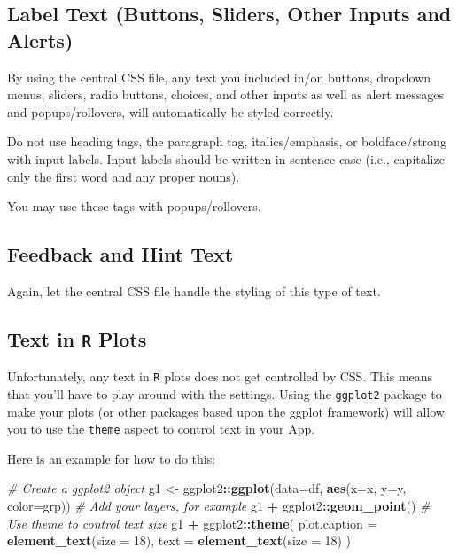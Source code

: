 \documentclass[
]{book}
\newenvironment{Shaded}{\begin{snugshade}}{\end{snugshade}}
\newcommand{\CommentTok}[1]{\textcolor[rgb]{0.56,0.35,0.01}{\textit{#1}}}
\newcommand{\DataTypeTok}[1]{\textcolor[rgb]{0.13,0.29,0.53}{#1}}
\newcommand{\DecValTok}[1]{\textcolor[rgb]{0.00,0.00,0.81}{#1}}
\newcommand{\KeywordTok}[1]{\textcolor[rgb]{0.13,0.29,0.53}{\textbf{#1}}}
\newcommand{\NormalTok}[1]{#1}
\newcommand{\OperatorTok}[1]{\textcolor[rgb]{0.81,0.36,0.00}{\textbf{#1}}}
\newcommand{\StringTok}[1]{\textcolor[rgb]{0.31,0.60,0.02}{#1}}
\begin{document}
\hypertarget{label-text-buttons-sliders-other-inputs-and-alerts}{%
\subsection{Label Text (Buttons, Sliders, Other Inputs and Alerts)}\label{label-text-buttons-sliders-other-inputs-and-alerts}}

By using the central CSS file, any text you included in/on buttons, dropdown menus, sliders, radio buttons, choices, and other inputs as well as alert messages and popups/rollovers, will automatically be styled correctly.

Do not use heading tags, the paragraph tag, italics/emphasis, or boldface/strong with input labels. Input labels should be written in sentence case (i.e., capitalize only the first word and any proper nouns).

You may use these tags with popups/rollovers.

\hypertarget{feedback-and-hint-text}{%
\subsection{Feedback and Hint Text}\label{feedback-and-hint-text}}

Again, let the central CSS file handle the styling of this type of text.

\hypertarget{text-in-r-plots}{%
\subsection{\texorpdfstring{Text in \texttt{R} Plots}{Text in R Plots}}\label{text-in-r-plots}}

Unfortunately, any text in \texttt{R} plots does not get controlled by CSS. This means that you'll have to play around with the settings. Using the \texttt{ggplot2} package to make your plots (or other packages based upon the ggplot framework) will allow you to use the \texttt{theme} aspect to control text in your App.

Here is an example for how to do this:

\begin{Shaded}
\begin{Highlighting}[]
\CommentTok{# Create a ggplot2 object}
\NormalTok{g1 <-}\StringTok{ }\NormalTok{ggplot2}\OperatorTok{::}\KeywordTok{ggplot}\NormalTok{(}\DataTypeTok{data=}\NormalTok{df, }\KeywordTok{aes}\NormalTok{(}\DataTypeTok{x=}\NormalTok{x, }\DataTypeTok{y=}\NormalTok{y, }\DataTypeTok{color=}\NormalTok{grp)) }
\CommentTok{# Add your layers, for example}
\NormalTok{g1 }\OperatorTok{+}\StringTok{ }\NormalTok{ggplot2}\OperatorTok{::}\KeywordTok{geom_point}\NormalTok{()}
\CommentTok{# Use theme to control text size}
\NormalTok{g1 }\OperatorTok{+}\StringTok{ }\NormalTok{ggplot2}\OperatorTok{::}\KeywordTok{theme}\NormalTok{(}
  \DataTypeTok{plot.caption =} \KeywordTok{element_text}\NormalTok{(}\DataTypeTok{size =} \DecValTok{18}\NormalTok{),}
  \DataTypeTok{text =} \KeywordTok{element_text}\NormalTok{(}\DataTypeTok{size =} \DecValTok{18}\NormalTok{)}
\NormalTok{  )}
\end{Highlighting}
\end{Shaded}
\end{document}
